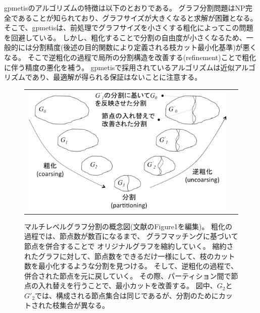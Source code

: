 gpmetisのアルゴリズムの特徴は以下のとおりである。
グラフ分割問題はNP完全であることが知られており、グラフサイズが大きくなると求解が困難となる。
そこで、gpmetisは、前処理でグラフサイズを小さくする粗化によってこの問題を回避している。
しかし、粗化することで分割の自由度が小さくなるため、一般的には分割精度(後述の目的関数により定義される枝カット最小化基準)が悪くなる。
そこで逆粗化の過程で局所の分割構造を改善する(refinement)ことで粗化に伴う精度の悪化を補う。
gpmetisで採用されているアルゴリズムは近似アルゴリズムであり、最適解が得られる保証はないことに注意する。

\begin{figure}[htbp]
\begin{center}
\begin{tabular}{cc}

\begin{minipage}{1.0\hsize}
\begin{center}
\includegraphics[scale=0.5]{./mgpmetis_abst.eps}
\caption{マルチレベルグラフ分割の概念図(文献\cite{Karypis1999}のFigure1を編集)。
粗化の過程では、節点数が数百になるまで、
グラフマッチングに基づいて節点を併合することで
オリジナルグラフを縮約していく。
縮約されたグラフに対して、節点数をできるだけ一様にして、枝のカット数を最小化するような分割を見つける。
そして、逆粗化の過程で、併合された節点を元に戻していく。
その際、パーティション間で節点の入れ替えを行うことで、最小カットを改善する。
図中、$G_2$と$G'_2$では、構成される節点集合は同じであるが、分割のためにカットされた枝集合が異なる。
\label{fig:mgpmetis_abst}}
\end{center}
\end{minipage}

\end{tabular} 
\end{center}
\end{figure} 



